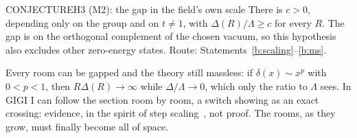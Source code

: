 \begin{claim}{CONJECTURE}{H3 (M2): the gap in the field's own scale}\label{b:h3}
There is $c>0$, depending only on the group and on $t\ne1$, with $\Delta(R)/\Lambda\ge c$ for every $R$. The gap is on
the orthogonal complement of the chosen vacuum, so this hypothesis also excludes other zero-energy states.
Route: Statements~\ref{b:scaling}--\ref{b:ms}.
\end{claim}

Every room can be gapped and the theory still massless: if $\delta(x)\sim x^p$ with $0<p<1$, then $R\Delta(R)\to\infty$
while $\Delta/\Lambda\to0$, which only the ratio to $\Lambda$ sees. In GIGI I can follow the section room by
room, a switch showing as an exact crossing: evidence, in the spirit of step scaling~\cite{LWW91}, not proof. The rooms, as they grow, must finally become all of
space.

